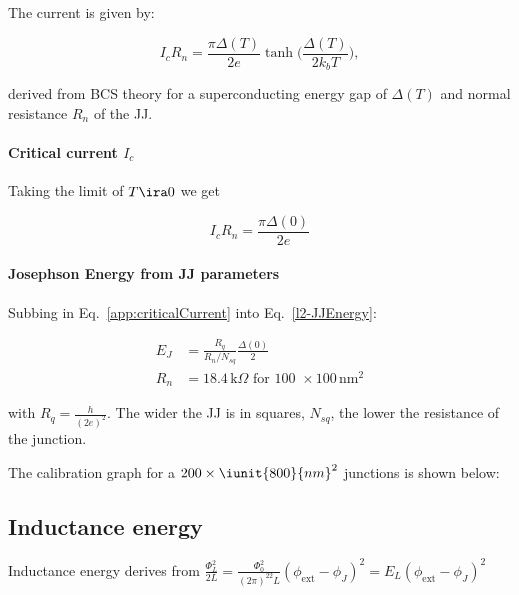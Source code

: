   \noindent The current is given by:

  \begin{equation}\label{key}
    I_cR_n = \frac{\pi\Delta(T)}{2e}\tanh\big(\frac{\Delta(T)}{2k_bT}\big),
  \end{equation}

  \noindent derived from BCS theory  for a superconducting energy gap of
  $ \Delta(T) $ and normal resistance $ R_n $ of the JJ.

  {
    \paragraph{Critical current $ I_c $}
    Taking the limit of $ T\ira0 $ we get

     \begin{equation}\label{app:criticalCurrent}
       I_cR_n = \frac{\pi\Delta(0)}{2e}
     \end{equation}
   }


   \begin{framed}\noindent
     \paragraph{Josephson   Energy  from   JJ  parameters}   Subbing  in
     Eq.~\eqref{app:criticalCurrent} into Eq.~\eqref{l2-JJEnergy}:

     \begin{equation}\label{key}
       \begin{aligned}
         E_J & = \frac{R_q}{R_n/N_{sq}}\frac{\Delta(0)}{2}\\
         R_n &= 18.4\,\text{k}\Omega \text{ for 100 } \times 100\,\text{nm}^2
       \end{aligned}
     \end{equation}

     \noindent with $ R_q = \frac{h}{(2e)^2}  $.  The wider the JJ is in
     squares, $ N_{sq} $, the lower the resistance of the junction.


     The calibration graph  for a $ 200 \times  \iunit{800}{nm}^2 $ junctions
     is shown below:


     \ec
   \end{framed}

  \subsection{Inductance energy}
  Inductance              energy               derives              from
  $                         \frac{\Phi_L^2}{2L}                        =
  \frac{\Phi_0^2}{(2\pi)^22L}(\phi_\text{ext}-\phi_J)^2                =
  E_L(\phi_\text{ext}-\phi_J)^2 $

